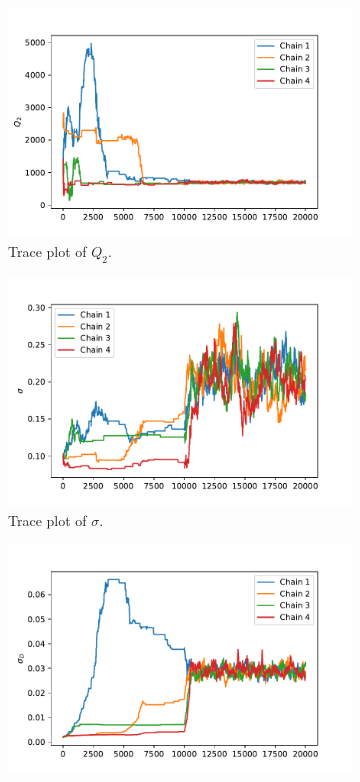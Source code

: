\begin{figure}[h!]
\begin{subfigure}{.5\textwidth}
  \includegraphics[width=\linewidth]{figures/bayesian/EXP_Q/trace_plot_Q2.pdf}
  \caption{Trace plot of $Q_{2}$.}
  \label{fig:subtpTm2}
\end{subfigure}
\newline
\begin{subfigure}{.5\textwidth}
  \centering
  \includegraphics[width=\linewidth]{figures/bayesian/EXP_Q/trace_plot_sigma.pdf}
  \caption{Trace plot of $\sigma$.}
  \label{fig:subtpsigma}
\end{subfigure}%
\begin{subfigure}{.5\textwidth}
  \centering
  \includegraphics[width=\linewidth]{figures/bayesian/EXP_Q/trace_plot_sigmaD.pdf}

\end{subfigure}
\end{figure}
